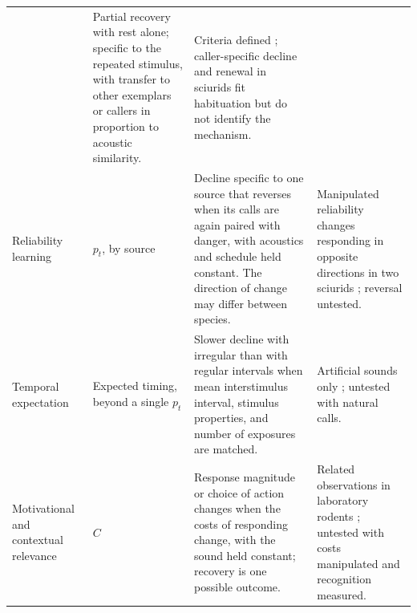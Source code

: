 \begin{table}[tbp]
\begin{tabular}{@{}>{\raggedright\arraybackslash}p{1.05in}>{\raggedright\arraybackslash}p{0.9in}>{\raggedright\arraybackslash}p{2.05in}>{\raggedright\arraybackslash}p{2.05in}@{}}
  & Partial recovery with rest alone; specific to the repeated stimulus, with transfer to other exemplars or callers in proportion to acoustic similarity.
  & Criteria defined \citep{RankinEtAl2009}; caller-specific decline and renewal in sciurids \citep{Hare1998,BlumsteinDaniel2004} fit habituation but do not identify the mechanism. \\
Reliability learning
  & $p_t$, by source
  & Decline specific to one source that reverses when its calls are again paired with danger, with acoustics and schedule held constant. The direction of change may differ between species.
  & Manipulated reliability changes responding in opposite directions in two sciurids \citep{HareAtkins2001,BlumsteinEtAl2004}; reversal untested. \\
Temporal expectation
  & Expected timing, beyond a single $p_t$
  & Slower decline with irregular than with regular intervals when mean interstimulus interval, stimulus properties, and number of exposures are matched.
  & Artificial sounds only \citep{Davis1970,HerryEtAl2007}; untested with natural calls. \\
Motivational and contextual relevance
  & $C$
  & Response magnitude or choice of action changes when the costs of responding change, with the sound held constant; recovery is one possible outcome.
  & Related observations in laboratory rodents \citep{MongeauEtAl2003,BerzEtAl2022}; untested with costs manipulated and recognition measured. \\
\bottomrule
\end{tabular}
\end{table}
